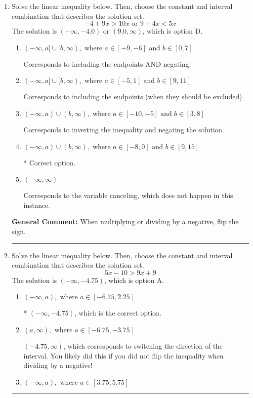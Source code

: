 \documentclass{extbook}[14pt]
\newcommand{\litem}[1]{\item #1

\rule{\textwidth}{0.4pt}}
\begin{document}
\begin{enumerate}\litem{
Solve the linear inequality below. Then, choose the constant and interval combination that describes the solution set.
\[ -4 + 9 x > 10 x \text{ or } 9 + 4 x < 5 x \]
The solution is \( (-\infty, -4.0) \text{ or } (9.0, \infty) \), which is option D.\begin{enumerate}[label=\Alph*.]
\item \( (-\infty, a] \cup [b, \infty), \text{ where } a \in [-9, -6] \text{ and } b \in [0, 7] \)

Corresponds to including the endpoints AND negating.
\item \( (-\infty, a] \cup [b, \infty), \text{ where } a \in [-5, 1] \text{ and } b \in [9, 11] \)

Corresponds to including the endpoints (when they should be excluded).
\item \( (-\infty, a) \cup (b, \infty), \text{ where } a \in [-10, -5] \text{ and } b \in [3, 8] \)

Corresponds to inverting the inequality and negating the solution.
\item \( (-\infty, a) \cup (b, \infty), \text{ where } a \in [-8, 0] \text{ and } b \in [9, 15] \)

 * Correct option.
\item \( (-\infty, \infty) \)

Corresponds to the variable canceling, which does not happen in this instance.
\end{enumerate}

\textbf{General Comment:} When multiplying or dividing by a negative, flip the sign.
}
\litem{
Solve the linear inequality below. Then, choose the constant and interval combination that describes the solution set.
\[ 5x -10 > 9x + 9 \]
The solution is \( (-\infty, -4.75) \), which is option A.\begin{enumerate}[label=\Alph*.]
\item \( (-\infty, a), \text{ where } a \in [-6.75, 2.25] \)

* $(-\infty, -4.75)$, which is the correct option.
\item \( (a, \infty), \text{ where } a \in [-6.75, -3.75] \)

 $(-4.75, \infty)$, which corresponds to switching the direction of the interval. You likely did this if you did not flip the inequality when dividing by a negative!
\item \( (-\infty, a), \text{ where } a \in [3.75, 5.75] \)


\end{enumerate}}
\end{enumerate}
\end{document}

